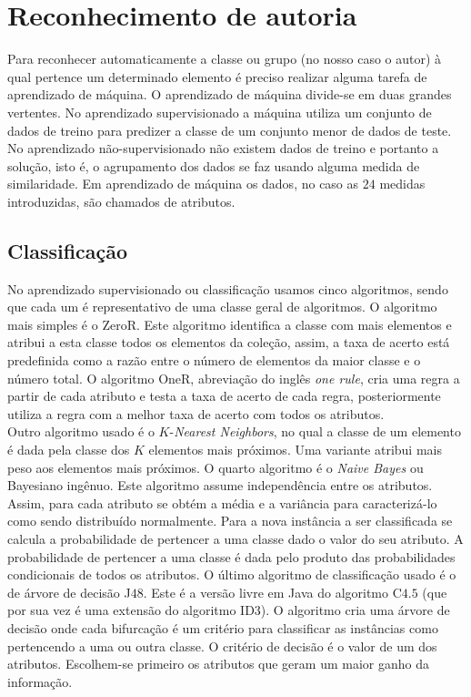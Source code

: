 \documentclass[a4paper,openright,12pt]{report} %
\begin{document}
\section{Reconhecimento de autoria}

Para reconhecer automaticamente a classe ou grupo (no nosso caso o autor) \`a qual pertence um determinado elemento \'e preciso realizar alguma tarefa de aprendizado de m\'aquina. O aprendizado de m\'aquina divide-se em duas grandes vertentes. No aprendizado supervisionado a m\'aquina utiliza um conjunto de dados de treino para predizer a classe de um conjunto menor de dados de teste. No aprendizado n\~ao-supervisionado n\~ao existem dados de treino e portanto a solu\c c\~ao, isto \'e, o agrupamento dos dados se faz usando alguma medida de similaridade. Em aprendizado de m\'aquina os dados, no caso as $24$ medidas introduzidas, s\~ao chamados de atributos.\\

\subsection{Classifica\c c\~ao}

No aprendizado supervisionado ou classifica\c c\~ao usamos cinco algoritmos, sendo que cada um \'e representativo de uma classe geral de algoritmos. O algoritmo mais simples \'e o \textsf{ZeroR}. Este algoritmo identifica a classe com mais elementos e atribui a esta classe todos os elementos da cole\c c\~ao, assim, a taxa de acerto est\'a predefinida como a raz\~ao entre o n\'umero de elementos da maior classe e o n\'umero total. O algoritmo \textsf{OneR}, abrevia\c c\~ao do ingl\^es \textit{one rule}, cria uma regra a partir de cada atributo e testa a taxa de acerto de cada regra, posteriormente utiliza a regra com a melhor taxa de acerto com todos os atributos.\\

Outro algoritmo usado \'e o $K$-\textit{Nearest Neighbors}, no qual a classe de um elemento \'e dada pela classe dos $K$ elementos mais pr\'oximos. Uma variante atribui mais peso aos elementos mais pr\'oximos. O quarto algoritmo \'e o \textit{Naive Bayes} ou Bayesiano ing\^enuo. Este algoritmo assume independ\^encia entre os atributos. Assim, para cada atributo se obt\'em a m\'edia e a vari\^ancia para caracteriz\'a-lo como sendo distribu\'ido normalmente. Para a nova inst\^ancia a ser classificada se calcula a probabilidade de pertencer a uma classe dado o valor do seu atributo. A probabilidade de pertencer a uma classe \'e dada pelo produto das probabilidades condicionais de todos os atributos. O \'ultimo algoritmo de classifica\c c\~ao usado \'e o de \'arvore de decis\~ao J$48$. Este \'e a vers\~ao livre em \textsf{Java} do algoritmo C$4.5$ (que por sua vez \'e uma extens\~ao do algoritmo \textsf{ID}$3$). O algoritmo cria uma \'arvore de decis\~ao onde cada bifurca\c c\~ao \'e um crit\'erio para classificar as inst\^ancias como pertencendo a uma ou outra classe. O crit\'erio de decis\~ao \'e o valor de um dos atributos. Escolhem-se primeiro os atributos que geram um maior ganho da informa\c c\~ao.\\
\end{document}
